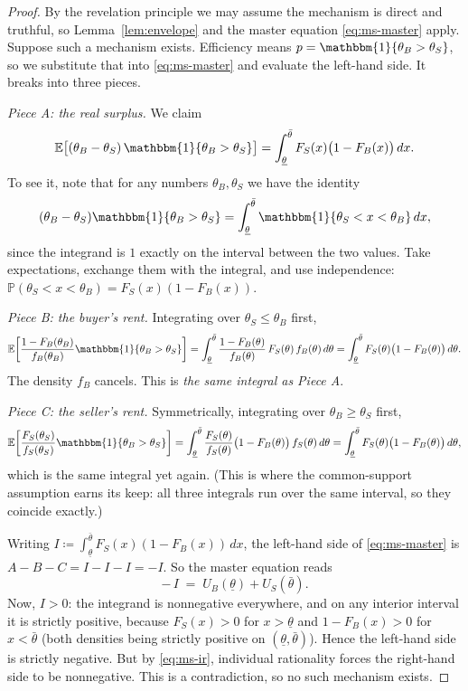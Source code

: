 \documentclass[12pt]{article}
\newcommand{\bbP}{\mathbb{P}}
\newcommand{\bbE}{\mathbb{E}}
\newcommand{\eqdef}{\coloneqq}                %
\theoremstyle{definition}
\theoremstyle{remark}
\theoremstyle{plain}                          %
\newcommand{\ind}{\mathbbm{1}}
\newcommand{\lo}{\underline{\theta}}
\newcommand{\hi}{\bar{\theta}}
\begin{document}
\begin{proof}
By the revelation principle we may assume the mechanism is direct and truthful, so Lemma~\ref{lem:envelope} and the master equation \eqref{eq:ms-master} apply. Suppose such a mechanism exists. Efficiency means $p = \ind\{\theta_B > \theta_S\}$, so we substitute that into \eqref{eq:ms-master} and evaluate the left-hand side. It breaks into three pieces.
 
\medskip
\noindent\emph{Piece A: the real surplus.} We claim
\[
    \bbE\big[(\theta_B - \theta_S)\,\ind\{\theta_B > \theta_S\}\big] = \int_{\lo}^{\hi} F_S(x)\big(1 - F_B(x)\big)\,dx.
\]
To see it, note that for any numbers $\theta_B,\theta_S$ we have the identity
\[
    (\theta_B - \theta_S)\ind\{\theta_B > \theta_S\} = \int_{\lo}^{\hi} \ind\{\theta_S < x < \theta_B\}\,dx,
\]
since the integrand is $1$ exactly on the interval between the two values. Take expectations, exchange them with the integral, and use independence: $\bbP(\theta_S < x < \theta_B) = F_S(x)(1-F_B(x))$.
 
\medskip
\noindent\emph{Piece B: the buyer's rent.} Integrating over $\theta_S \le \theta_B$ first,
\[
    \bbE\!\left[\frac{1-F_B(\theta_B)}{f_B(\theta_B)}\ind\{\theta_B > \theta_S\}\right]
    = \int_{\lo}^{\hi} \frac{1-F_B(\theta)}{f_B(\theta)}\,F_S(\theta)\,f_B(\theta)\,d\theta
    = \int_{\lo}^{\hi} F_S(\theta)\big(1-F_B(\theta)\big)\,d\theta.
\]
The density $f_B$ cancels. This is \emph{the same integral as Piece A}.
 
\medskip
\noindent\emph{Piece C: the seller's rent.} Symmetrically, integrating over $\theta_B \ge \theta_S$ first,
\[
    \bbE\!\left[\frac{F_S(\theta_S)}{f_S(\theta_S)}\ind\{\theta_B > \theta_S\}\right]
    = \int_{\lo}^{\hi} \frac{F_S(\theta)}{f_S(\theta)}\big(1-F_B(\theta)\big)\,f_S(\theta)\,d\theta
    = \int_{\lo}^{\hi} F_S(\theta)\big(1-F_B(\theta)\big)\,d\theta,
\]
which is the same integral yet again. (This is where the common-support assumption earns its keep: all three integrals run over the same interval, so they coincide exactly.)
 
\medskip
Writing $I \eqdef \int_{\lo}^{\hi} F_S(x)(1-F_B(x))\,dx$, the left-hand side of \eqref{eq:ms-master} is $A - B - C = I - I - I = -I$. So the master equation reads
\[
    -\,I \;=\; U_B(\lo) + U_S(\hi).
\]
Now, $I > 0$: the integrand is nonnegative everywhere, and on any interior interval it is strictly positive, because $F_S(x) > 0$ for $x > \lo$ and $1 - F_B(x) > 0$ for $x < \hi$ (both densities being strictly positive on $(\lo,\hi)$). Hence the left-hand side is strictly negative. But by \eqref{eq:ms-ir}, individual rationality forces the right-hand side to be nonnegative. This is a contradiction, so no such mechanism exists.
\end{proof}
 
\end{document}
